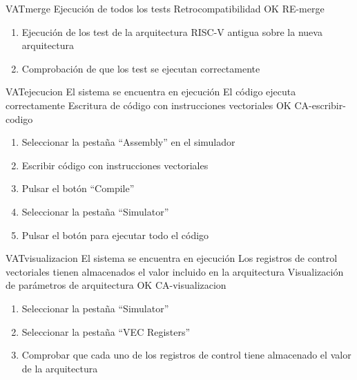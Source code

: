 \begin{testCase}{VAT}{merge}
    {\NA}
    {Ejecución de todos los tests}
    {Retrocompatibilidad}
    {OK} %
    {RE-merge}
    \begin{enumerate}
        \item Ejecución de los test de la arquitectura RISC-V antigua sobre la nueva arquitectura
        \item Comprobación de que los test se ejecutan correctamente
    \end{enumerate}
\end{testCase}

\begin{testCase}{VAT}{ejecucion}
    {El sistema se encuentra en ejecución}
    {El código ejecuta correctamente}
    {Escritura de código con instrucciones vectoriales} %
    {OK} %
    {CA-escribir-codigo}
    \begin{enumerate}
        \item Seleccionar la pestaña ``Assembly'' en el simulador
        \item Escribir código con instrucciones vectoriales
        \item Pulsar el botón ``Compile''
        \item Seleccionar la pestaña ``Simulator''
        \item Pulsar el botón para ejecutar todo el código
    \end{enumerate}
\end{testCase}


\begin{testCase}{VAT}{visualizacion}
    {El sistema se encuentra en ejecución}
    {Los registros de control vectoriales tienen almacenados el valor incluido en la arquitectura}
    {Visualización de parámetros de arquitectura} %
    {OK} %
    {CA-visualizacion}
    \begin{enumerate}
        \item Seleccionar la pestaña ``Simulator''
        \item Seleccionar la pestaña ``VEC Registers''
        \item Comprobar que cada uno de los registros de control tiene almacenado el valor de la arquitectura
    \end{enumerate}
\end{testCase}


